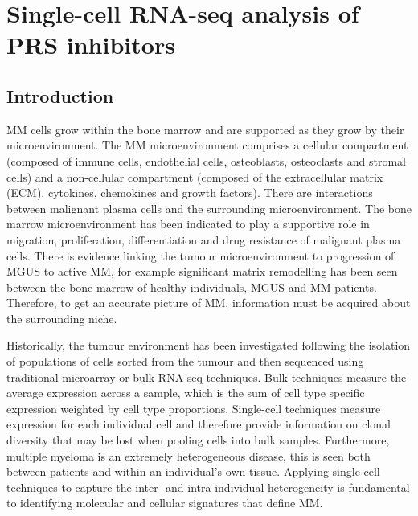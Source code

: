 \chapter{\label{ch:6-sc}Single-cell RNA-seq analysis of PRS inhibitors}


\section{Introduction}
MM cells grow within the bone marrow and are supported as they grow by their microenvironment.
The MM microenvironment comprises a cellular compartment (composed of immune cells, endothelial cells, osteoblasts, osteoclasts and stromal cells) and a non-cellular compartment (composed of the extracellular matrix (ECM), cytokines, chemokines and growth factors)\cite{manier2012bone, kawano2015targeting}.
There are interactions between malignant plasma cells and the surrounding microenvironment.
The bone marrow microenvironment has been indicated to play a supportive role in migration, proliferation, differentiation and drug resistance of malignant plasma cells.
There is evidence linking the tumour microenvironment to progression of MGUS to active MM, for example significant matrix remodelling has been seen between the bone marrow of healthy individuals, MGUS and MM patients\cite{kawano2015targeting}.
Therefore, to get an accurate picture of MM, information must be acquired about the surrounding niche.

Historically, the tumour environment has been investigated following the isolation of populations of cells sorted from the tumour and then sequenced using traditional microarray or bulk RNA-seq techniques.
Bulk techniques measure the average expression across a sample, which is the sum of cell type specific expression weighted by cell type proportions.
Single-cell techniques measure expression for each individual cell and therefore provide information on clonal diversity that may be lost when pooling cells into bulk samples.
Furthermore, multiple myeloma is an extremely heterogeneous disease, this is seen both between patients and within an individual's own tissue.
Applying single-cell techniques to capture the inter- and intra-individual heterogeneity is fundamental to identifying molecular and cellular signatures that define MM\@.


